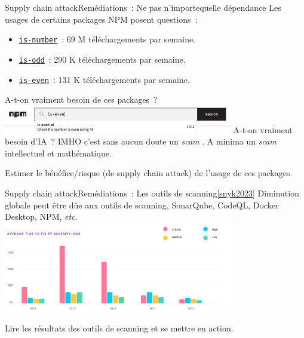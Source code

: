 \documentclass{beamer}
\begin{document}
    \begin{frame}{Supply chain attack}{Remédiations~: Ne pas  n'importequelle dépendance}
        Les usages de certains packages NPM posent questions~:
        \begin{itemize}
            \item \href{https://www.npmjs.com/package/is-number}{\lstinline{is-number}}~: 69 M téléchargements par semaine.
            \item \href{https://www.npmjs.com/package/is-odd}{\lstinline{is-odd}}~: 290 K téléchargements par semaine.
            \item \href{https://www.npmjs.com/package/is-even}{\lstinline{is-even}}~: 131 K téléchargements par semaine.
        \end{itemize}
        A-t-on vraiment besoin de ces packages~?
        \bigbreak
        \centering
        \includegraphics[width=10cm]{image/ai-everywhere}
        \flushleft
        \bigbreak
        A-t-on vraiment besoin d'IA~?
        \bigbreak
        IMHO c'est sans aucun doute un \textit{scam} .
        A minima un \textit{scam} intellectuel et mathématique.
        \begin{dangercolorbox}
            Estimer le bénéfice/risque (de supply chain attack) de l'usage de ces packages.
        \end{dangercolorbox}
    \end{frame}

    \begin{frame}{Supply chain attack}{Remédiations~: Les outils de scanning\cref{snyk2023}}
        Diminution globale peut être dûe aux outils de scanning, SonarQube, CodeQL, Docker Desktop, NPM, \textit{etc}.
        \bigbreak
        \centering
        \includegraphics[width=10cm]{image/vuln-time-to-fix}
        \flushleft
        \begin{dangercolorbox}
            Lire les résultats des outils de scanning et se mettre en action.
        \end{dangercolorbox}
    \end{frame}
\end{document}
